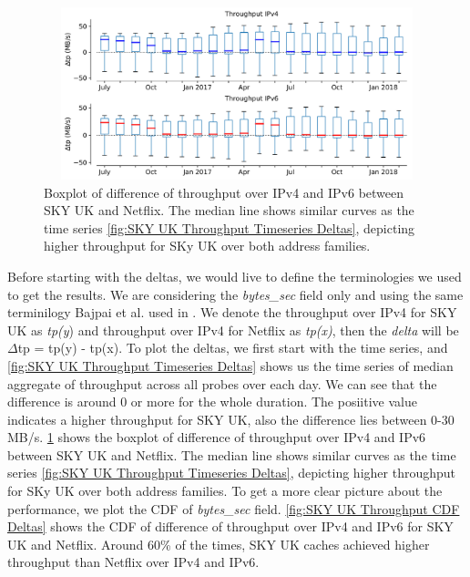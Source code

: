 \begin{figure}[!ht]
	\centering
	\includegraphics[keepaspectratio, height=5cm, width=15cm]{figures/cache/bskyb/netflix-throughput-boxplot-asn-5607.pdf}
	\caption[SKY UK Throughput Boxplot Deltas]{Boxplot of difference of throughput over IPv4 and IPv6 between SKY UK and Netflix. The median line shows similar curves as the time series \cref{fig:SKY UK Throughput Timeseries Deltas}, depicting higher throughput for SKy UK over both address families.}
	\label{fig:SKY UK Throughput Boxplot Deltas}
\end{figure}

Before starting with the deltas, we would live to define the terminologies we used to get the results. We are considering the \textit{bytes\_sec} field only and using the same terminilogy Bajpai et al. used in \cite{bajpaimeasuring}. We denote the throughput 
over IPv4 for SKY UK as \textit{tp(y}) and throughput over IPv4 for Netflix as \textit{tp(x)}, then the \textit{delta} will be $\Delta$tp = tp(y) - tp(x).
To plot the deltas, we first start with the time series, and \cref{fig:SKY UK Throughput Timeseries Deltas} shows us the time series of median aggregate of throughput across all probes over each day.
We can see that the difference is around 0 or more for the whole duration. The posiitive value indicates a higher throughput for SKY UK, also the difference lies between 0-30 MB/s.
\cref{fig:SKY UK Throughput Boxplot Deltas} shows the boxplot of difference of throughput over IPv4 and IPv6 between SKY UK and Netflix. The median line shows similar curves as the time series \cref{fig:SKY UK Throughput Timeseries Deltas}, depicting higher throughput for SKy UK over both address families.
To get a more clear picture about the performance, we plot the CDF of \textit{bytes\_sec} field. 
\cref{fig:SKY UK Throughput CDF Deltas} shows the CDF of difference of throughput over IPv4 and IPv6 for SKY UK and Netflix. 
Around 60\% of the times, SKY UK caches achieved higher throughput than Netflix over IPv4 and IPv6.

